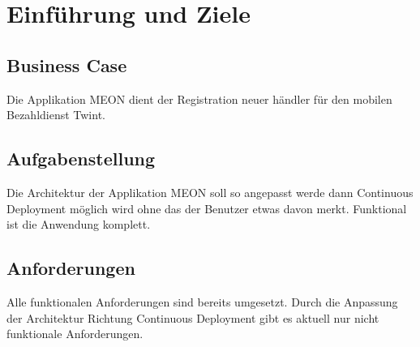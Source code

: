 \graphicspath{{./images/}}


\chapter{Einführung und Ziele}

\section{Business Case}

Die Applikation MEON dient der Registration neuer händler für den mobilen Bezahldienst Twint. 

\section{Aufgabenstellung}

Die Architektur der Applikation MEON soll so angepasst werde dann Continuous Deployment möglich wird ohne das der Benutzer etwas davon merkt. Funktional ist die Anwendung komplett.

\section{Anforderungen}

Alle funktionalen Anforderungen sind bereits umgesetzt. Durch die Anpassung der Architektur Richtung Continuous Deployment gibt es aktuell nur nicht funktionale Anforderungen.

